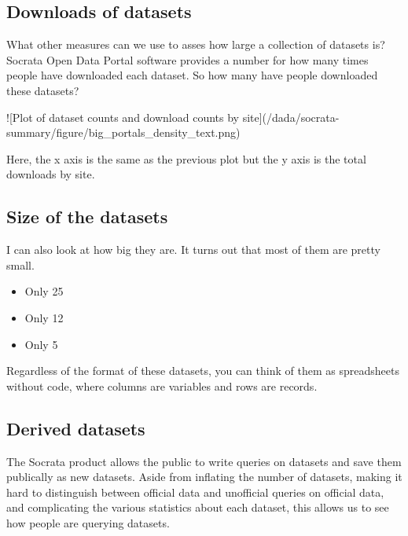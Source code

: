\documentclass{acm_proc_article-sp}
\begin{document}
\subsection{Downloads of datasets}
What other measures can we use to asses how large a collection of datasets is?
Socrata Open Data Portal software provides a number for
how many times people have downloaded each dataset.
So how many have people downloaded these datasets?

![Plot of dataset counts and download counts by site](/dada/socrata-summary/figure/big_portals_density_text.png)

Here, the x axis is the same as the previous plot but the y axis is the total
downloads by site.

\subsection{Size of the datasets}
I can also look at how big they are.
It turns out that most of them are pretty small.

\begin{itemize}
\item Only 25%
\item Only 12%
\item Only 5%
\end{itemize}


Regardless of the format of these datasets, you can think of them as
spreadsheets without code, where columns are variables and rows are records.



\subsection{Derived datasets}
The Socrata product allows the public to write queries on datasets and
save them publically as new datasets. Aside from inflating the number
of datasets, making it hard to distinguish between official data and
unofficial queries on official data, and complicating the various
statistics about each dataset, this allows us to see how people are
querying datasets.
\end{document}
